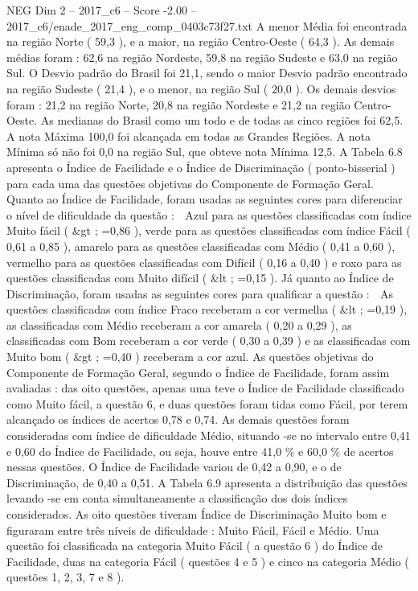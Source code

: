 \begin{textsample}{NEG Dim 2 – 2017\_c6 – Score -2.00 – 2017\_c6/enade\_2017\_eng\_comp\_0403c73f27.txt}
A menor Média foi encontrada na região Norte ( 59,3 ), e a maior, na região Centro-Oeste ( 64,3 ).
As demais médias foram : 62,6 na região Nordeste, 59,8 na região Sudeste e 63,0 na região Sul.
O Desvio padrão do Brasil foi 21,1, sendo o maior Desvio padrão encontrado na região Sudeste ( 21,4 ), e o menor, na região Sul ( 20,0 ).
Os demais desvios foram : 21,2 na região Norte, 20,8 na região Nordeste e 21,2 na região Centro-Oeste.
As medianas do Brasil como um todo e de todas as cinco regiões foi 62,5.
A nota Máxima 100,0 foi alcançada em todas as Grandes Regiões.
A nota Mínima só não foi 0,0 na região Sul, que obteve nota Mínima 12,5.
A Tabela 6.8 apresenta o Índice de Facilidade e o Índice de Discriminação ( ponto-bisserial ) para cada uma das questões objetivas do Componente de Formação Geral.
Quanto ao Índice de Facilidade, foram usadas as seguintes cores para diferenciar o nível de dificuldade da questão :  Azul para as questões classificadas com índice Muito fácil ( \&gt ; =0,86 ), verde para as questões classificadas com índice Fácil ( 0,61 a 0,85 ), amarelo para as questões classificadas com Médio ( 0,41 a 0,60 ), vermelho para as questões classificadas com Difícil ( 0,16 a 0,40 ) e roxo para as questões classificadas com Muito difícil ( \&lt ; =0,15 ).
Já quanto ao Índice de Discriminação, foram usadas as seguintes cores para qualificar a questão :  As questões classificadas com índice Fraco receberam a cor vermelha ( \&lt ; =0,19 ), as classificadas com Médio receberam a cor amarela ( 0,20 a 0,29 ), as classificadas com Bom receberam a cor verde ( 0,30 a 0,39 ) e as classificadas com Muito bom ( \&gt ; =0,40 ) receberam a cor azul.
As questões objetivas do Componente de Formação Geral, segundo o Índice de Facilidade, foram assim avaliadas : das oito questões, apenas uma teve o Índice de Facilidade classificado como Muito fácil, a questão 6, e duas questões foram tidas como Fácil, por terem alcançado os índices de acertos 0,78 e 0,74.
As demais questões foram consideradas com índice de dificuldade Médio, situando -se no intervalo entre 0,41 e 0,60 do Índice de Facilidade, ou seja, houve entre 41,0 \% e 60,0 \% de acertos nessas questões.
O Índice de Facilidade variou de 0,42 a 0,90, e o de Discriminação, de 0,40 a 0,51.
A Tabela 6.9 apresenta a distribuição das questões levando -se em conta simultaneamente a classificação dos dois índices considerados.
As oito questões tiveram Índice de Discriminação Muito bom e figuraram entre três níveis de dificuldade : Muito Fácil, Fácil e Médio.
Uma questão foi classificada na categoria Muito Fácil ( a questão 6 ) do Índice de Facilidade, duas na categoria Fácil ( questões 4 e 5 ) e cinco na categoria Médio ( questões 1, 2, 3, 7 e 8 ).

\end{textsample}
